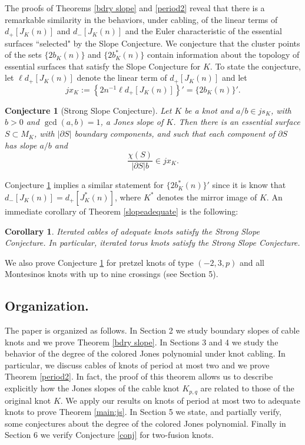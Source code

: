 \documentclass[11pt]{amsart}
\newtheorem{corollary}[theorem]{Corollary}
\newtheorem{conjecture}[theorem]{Conjecture}
\theoremstyle{definition}
\newcommand{\K}{{K_{p, q}}}
\newcommand{\abs}[1]{{\left\vert #1 \right\vert}}
\begin{document}
The proofs of Theorems  \ref{bdry slope} and \ref{period2} reveal that there is a remarkable similarity 
in the behaviors, under cabling,  of the  linear terms of $d_+[J_K(n)]$ and $d_-[J_K(n)]$ and the Euler characteristic of the essential surfaces
``selected" by the Slope Conjecture.  We conjecture that
the cluster points of the sets $\{2b_K(n)\}$ and $\{2b_K^{*}(n)\}$ contain information about the topology of essential surfaces
 that satisfy the Slope Conjecture for $K$. 
To state the conjecture, 
let  $\ell d_+[J_K(n)]$ denote the linear term of $d_+[J_K(n)]$ and let
$$jx_K:= \left\{ 2n^{-1}\ell d_+[J_K(n)]  \right\}'=\{2b_K(n)\}'.$$
\begin{conjecture} [{\rm Strong Slope Conjecture}] \label{slopeaug} Let $K$ be a knot and $a/b\in js_K$, with $b>0$ and $\gcd(a, b)=1$,  a  Jones slope of $K$. Then there is an essential surface $S\subset M_K$, with $\abs{\partial S}$  boundary components, 
and such that each component of $\partial S$ has slope $a/b$ and
$$\frac{\chi(S)}{{\abs{\partial S} b}} \in jx_K.$$
\end{conjecture}

Conjecture \ref{slopeaug}  implies a similar statement for $\{2b^*_K(n)\}'$ since it is know that
$d_-[J_K(n)] =d_+[J_K^*(n)]$, where $K^*$ denotes the mirror image of $K$.
An immediate corollary of Theorem \ref{slopeadequate} is the following:

\begin{corollary} Iterated cables of adequate knots satisfy the Strong Slope Conjecture. In particular, iterated torus knots satisfy the Strong Slope Conjecture.
\end{corollary}

We  also prove Conjecture \ref{slopeaug}  for 
pretzel knots of type $(-2, 3, p)$ and all
Montesinos knots with up to nine crossings (see Section 5).



\subsection{\bf Organization.} The paper is organized as follows. In Section 2 we study boundary slopes of cable knots and we prove Theorem \ref{bdry slope}.  In Sections 3 and 4 we study the behavior  of the degree of the colored Jones polynomial  under knot cabling. In particular,  we discuss cables
of knots of period at most two and we prove Theorem \ref{period2}. In fact, the proof of this theorem allows us to describe explicitly how the Jones slopes of the cable knot $\K$ are related to those of the original knot $K$. We apply our results on knots of period at most two to adequate knots to prove Theorem \ref{main:js}.  
In Section 5 we state, and partially verify, some conjectures about the degree of the colored Jones polynomial. Finally in Section 6 we verify Conjecture \ref{conj} for two-fusion knots.
\end{document}
